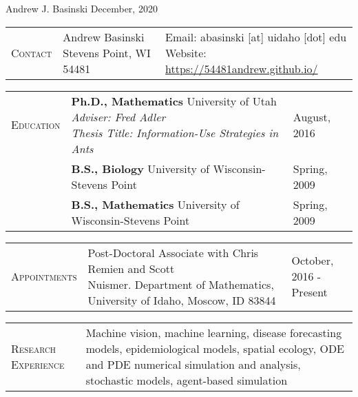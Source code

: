 \documentclass[11pt]{article}
\newcommand{\cellone}{3.5cm} %
\newcommand{\celltwo}{11cm}
\newcommand{\cellthree}{4cm}
\newcommand{\incellone}{3cm}
\newcommand{\incelltwo}{5cm}
\newcommand{\incellthree}{10cm}
\newcommand{\spa}{\vspace{.4in}}
\begin{document}
{\huge Andrew J. Basinski \hspace{2.5in} December, 2020}

\noindent\makebox[\linewidth]{\rule{\linewidth}{0.4pt}}

\spa

\begin{tabularx}{\textwidth}{p{\incellone} p{\incelltwo} p{\incellthree}}

  C\textsc{ontact} & \parbox[t]{5 cm}{Andrew Basinski \\ Stevens Point, WI 54481} & \parbox[t]{8cm}{Email: abasinski [at] uidaho [dot] edu\\ Website: \url{https://54481andrew.github.io/}
  } \\

\end{tabularx}

\spa

\begin{tabularx}{\textwidth}{p{\cellone} p{\celltwo} p{\cellthree}}
E\textsc{ducation} & \parbox[t]{\celltwo}{{\bf Ph.D., Mathematics} University of Utah \\  \emph{Adviser: Fred Adler} \\ \emph{Thesis Title: Information-Use Strategies in Ants}} &  August, 2016 \\[.5in]   

		          & \parbox[t][0cm]{13cm}{{\bf B.S., Biology} University of Wisconsin-Stevens Point} & Spring, 2009 \\
		          & \parbox[t]{13cm}{{\bf B.S., Mathematics} University of Wisconsin-Stevens Point} & Spring, 2009 \\
\end{tabularx}

\spa

\begin{tabularx}{\textwidth}{p{\cellone} p{\celltwo} p{\cellthree}}
    \parbox[t][0cm]{\cellone}{A\textsc{ppointments}}  & \parbox[t]{10cm}{Post-Doctoral Associate with Chris Remien and Scott \\ Nuismer. Department of Mathematics, University of Idaho, Moscow, ID 83844} & \parbox[t][]{\cellthree}{October, 2016 - \\ Present}
\end{tabularx}




\spa

\begin{tabularx}{\textwidth}{p{\cellone} p{\celltwo}}
  \parbox[t][0cm]{\cellone}{R\textsc{esearch} E\textsc{xperience}} &  \parbox[t][0cm]{12cm}{
    Machine vision, machine learning, disease forecasting models, epidemiological models, spatial ecology, ODE and PDE numerical simulation and analysis, stochastic models, agent-based simulation}
\end{tabularx}
\end{document}
